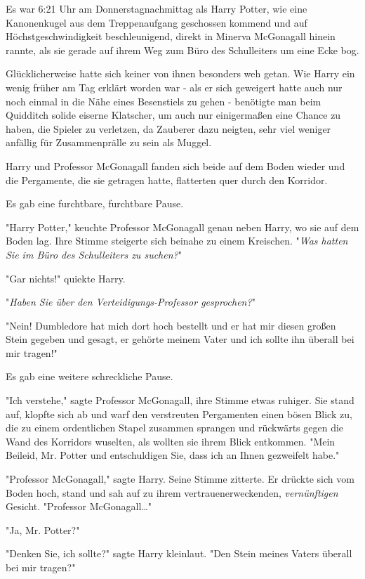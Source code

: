 {Es war 6:21 Uhr am Donnerstagnachmittag als Harry Potter, wie eine Kanonenkugel aus dem Treppenaufgang geschossen kommend und auf Höchstgeschwindigkeit beschleunigend, direkt in Minerva McGonagall hinein rannte, als sie gerade auf ihrem Weg zum Büro des Schulleiters um eine Ecke bog.

Glücklicherweise hatte sich keiner von ihnen besonders weh getan. Wie Harry ein wenig früher am Tag erklärt worden war - als er sich geweigert hatte auch nur noch einmal in die Nähe eines Besenstiels zu gehen - benötigte man beim Quidditch solide eiserne Klatscher, um auch nur einigermaßen eine Chance zu haben, die Spieler zu verletzen, da Zauberer dazu neigten, sehr viel weniger anfällig für Zusammenprälle zu sein als Muggel.

Harry und Professor McGonagall fanden sich beide auf dem Boden wieder und die Pergamente, die sie getragen hatte, flatterten quer durch den Korridor.

Es gab eine furchtbare, furchtbare Pause.

"Harry Potter," keuchte Professor McGonagall genau neben Harry, wo sie auf dem Boden lag. Ihre Stimme steigerte sich beinahe zu einem Kreischen. "\emph{Was hatten Sie im Büro des Schulleiters zu suchen?}"

"Gar nichts!" quiekte Harry.

"\emph{Haben Sie über den Verteidigungs-Professor gesprochen?}"

"Nein! Dumbledore hat mich dort hoch bestellt und er hat mir diesen großen Stein gegeben und gesagt, er gehörte meinem Vater und ich sollte ihn überall bei mir tragen!"

Es gab eine weitere schreckliche Pause.

"Ich verstehe," sagte Professor McGonagall, ihre Stimme etwas ruhiger. Sie stand auf, klopfte sich ab und warf den verstreuten Pergamenten einen bösen Blick zu, die zu einem ordentlichen Stapel zusammen sprangen und rückwärts gegen die Wand des Korridors wuselten, als wollten sie ihrem Blick entkommen. "Mein Beileid, Mr. Potter und entschuldigen Sie, dass ich an Ihnen gezweifelt habe."

"Professor McGonagall," sagte Harry. Seine Stimme zitterte. Er drückte sich vom Boden hoch, stand und sah auf zu ihrem vertrauenerweckenden, \emph{vernünftigen} Gesicht. "Professor McGonagall…"

"Ja, Mr. Potter?"

"Denken Sie, ich sollte?" sagte Harry kleinlaut. "Den Stein meines Vaters überall bei mir tragen?"

}
